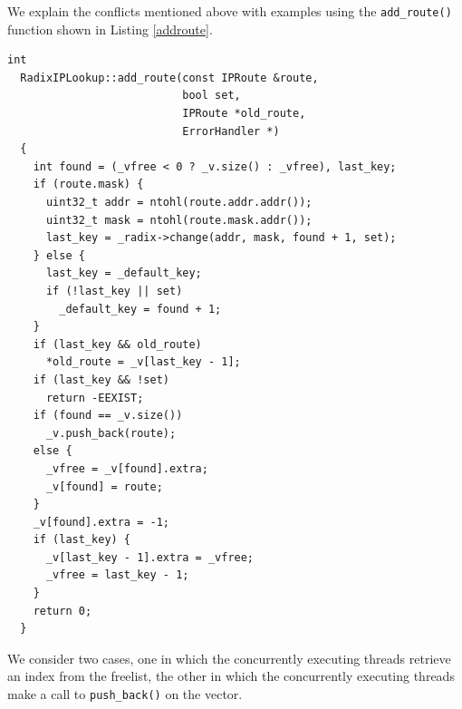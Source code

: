 \documentclass[a4paper]{article}
\begin{document}
We explain the conflicts mentioned above with examples using the \verb+add_route()+ function shown in  Listing \ref{addroute}.
\begin{lstlisting}[caption = The add\_route function, label=addroute,float=tph]
  int
  RadixIPLookup::add_route(const IPRoute &route, 
                           bool set, 
                           IPRoute *old_route, 
                           ErrorHandler *)
  {
    int found = (_vfree < 0 ? _v.size() : _vfree), last_key;
    if (route.mask) {
      uint32_t addr = ntohl(route.addr.addr());
      uint32_t mask = ntohl(route.mask.addr());
      last_key = _radix->change(addr, mask, found + 1, set);
    } else {
      last_key = _default_key;
      if (!last_key || set)
        _default_key = found + 1;
    }
    if (last_key && old_route)
      *old_route = _v[last_key - 1];
    if (last_key && !set)
      return -EEXIST;
    if (found == _v.size())
      _v.push_back(route);
    else {
      _vfree = _v[found].extra;
      _v[found] = route;
    }
    _v[found].extra = -1;
    if (last_key) {
      _v[last_key - 1].extra = _vfree;
      _vfree = last_key - 1;
    }
    return 0;
  }
\end{lstlisting}
We consider two cases, one in which the concurrently executing threads retrieve an index from the freelist, the other in which the concurrently executing threads make a call to \verb+push_back()+ on the vector.\\
\end{document}
